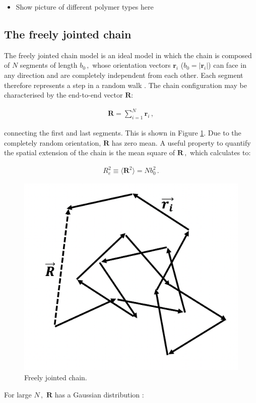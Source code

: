\documentclass[bachelor,       %
               twoside,        %
               BCOR10mm,       %
               ngerman, english %
               ]{GAUBM}
\begin{document}
\begin{itemize}
    \item Show picture of different polymer types here
\end{itemize}

\subsection{The freely jointed chain}

The freely jointed chain model is an ideal model in which the chain is composed of $N$ segments of length $b_0\,,$ whose orientation vectors $\mathbf r_i$ ($b_0=|\mathbf r_i|$) can face in any direction and are completely independent from each other. Each segment therefore represents a step in a random walk \cite{Doi_edwards}. The chain configuration may be characterised by the end-to-end vector $\mathbf R$:

\begin{align}
    \mathbf R=\sum_{i=1}^{N}\mathbf r_i\,,
\end{align}

connecting the first and last segments. This is shown in Figure \ref{fig:ideal_chain}. Due to the completely random orientation, $\mathbf R$ has zero mean. A useful property to quantify the spatial extension of the chain is the mean square of $\mathbf R\,,$ which calculates to:

\begin{align}
    R_e^2\equiv \langle\mathbf R^2\rangle=Nb_0^2\,.
    \label{eq:Re}
\end{align}

\begin{figure}[h]
  \centering
  \includegraphics[width=0.5\linewidth]{figures/ideal_chain.png}
  \caption{Freely jointed chain.}
  \label{fig:ideal_chain}
\end{figure}

For large $N\,,$ $\mathbf R$ has a Gaussian distribution \cite{Rubin03}:
 
\end{document}
